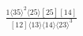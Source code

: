 \documentclass[varwidth, border=5pt]{standalone}
\begin{document}
\begin{my}
$\begin{gathered}
\scriptscriptstyle\frac{1⟨35⟩^2⟨25⟩[25][14]}{[12]⟨13⟩⟨14⟩⟨23⟩^3}
\end{gathered}$
\end{my}
\end{document}
